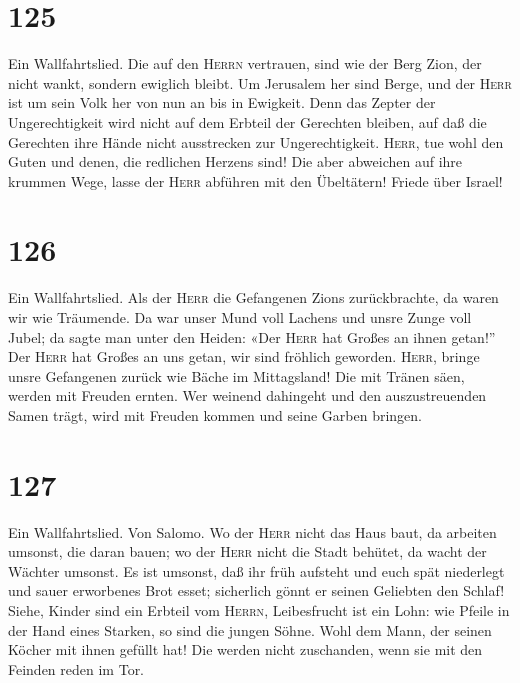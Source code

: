 \hypertarget{section-124}{%
\section{125}\label{section-124}}

 Ein Wallfahrtslied. Die auf den \textsc{Herrn} vertrauen,
sind wie der Berg Zion, der nicht wankt, sondern ewiglich bleibt.
 Um Jerusalem her sind Berge, und der \textsc{Herr} ist um
sein Volk her von nun an bis in Ewigkeit.  Denn das Zepter
der Ungerechtigkeit wird nicht auf dem Erbteil der Gerechten bleiben,
auf daß die Gerechten ihre Hände nicht ausstrecken zur Ungerechtigkeit.
 \textsc{Herr}, tue wohl den Guten und denen, die
redlichen Herzens sind!  Die aber abweichen auf ihre
krummen Wege, lasse der \textsc{Herr} abführen mit den Übeltätern!
Friede über Israel!

\hypertarget{section-125}{%
\section{126}\label{section-125}}

 Ein Wallfahrtslied. Als der \textsc{Herr} die Gefangenen
Zions zurückbrachte, da waren wir wie Träumende.  Da war
unser Mund voll Lachens und unsre Zunge voll Jubel; da sagte man unter
den Heiden: «Der \textsc{Herr} hat Großes an ihnen getan!''
 Der \textsc{Herr} hat Großes an uns getan, wir sind
fröhlich geworden.  \textsc{Herr}, bringe unsre Gefangenen
zurück wie Bäche im Mittagsland!  Die mit Tränen säen,
werden mit Freuden ernten.  Wer weinend dahingeht und den
auszustreuenden Samen trägt, wird mit Freuden kommen und seine Garben
bringen.

\hypertarget{section-126}{%
\section{127}\label{section-126}}

 Ein Wallfahrtslied. Von Salomo. Wo der \textsc{Herr}
nicht das Haus baut, da arbeiten umsonst, die daran bauen; wo der
\textsc{Herr} nicht die Stadt behütet, da wacht der Wächter umsonst.
 Es ist umsonst, daß ihr früh aufsteht und euch spät
niederlegt und sauer erworbenes Brot esset; sicherlich gönnt er seinen
Geliebten den Schlaf!  Siehe, Kinder sind ein Erbteil vom
\textsc{Herrn}, Leibesfrucht ist ein Lohn:  wie Pfeile in
der Hand eines Starken, so sind die jungen Söhne.  Wohl
dem Mann, der seinen Köcher mit ihnen gefüllt hat! Die werden nicht
zuschanden, wenn sie mit den Feinden reden im Tor.

